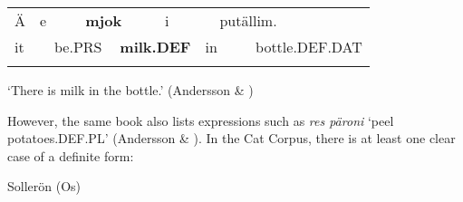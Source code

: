 \begin{tabular}{llllllllll}
\lsptoprule
Ä & \multicolumn{2}{l}{e

} & \multicolumn{2}{l}{{\bfseries mjok}

} & \multicolumn{2}{l}{i

} & \multicolumn{2}{l}{putällim.

} & \\
\multicolumn{2}{l}{it

} & \multicolumn{2}{l}{be.PRS

} & \multicolumn{2}{l}{{\bfseries milk.DEF}

} & \multicolumn{2}{l}{in

} & \multicolumn{2}{l}{bottle.DEF.DAT

}\\
\lspbottomrule
\end{tabular}

\begin{styleTranslation}
‘There is milk in the bottle.’ (Andersson \& \citet[373]{Danielsson1999})

\end{styleTranslation}

\begin{styleBodyTextFirst}
However, the same book also lists expressions such as \textit{res päroni} ‘peel potatoes.DEF.PL’ (Andersson \& \citet[176]{Danielsson1999}). In the Cat Corpus, there is at least one clear case of a definite form:

\end{styleBodyTextFirst}


\begin{listWWNumileveli}
\item 

\begin{styleExample}
Sollerön (Os) 

\end{styleExample}

\end{listWWNumileveli}

